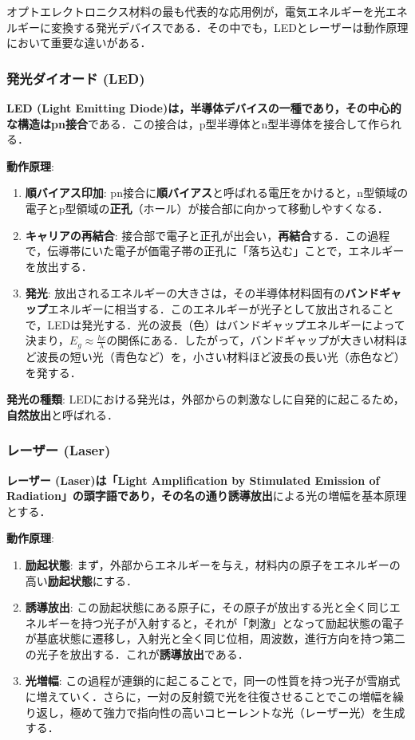 \documentclass[11pt,a4paper]{ltjsarticle}
\newcommand{\supcite}[1]{\textsuperscript{\cite{#1}}}
\begin{document}
オプトエレクトロニクス材料の最も代表的な応用例が，電気エネルギーを光エネルギーに変換する発光デバイスである．その中でも，LEDとレーザーは動作原理において重要な違いがある．

\subsubsection{発光ダイオード (LED)}

\textbf{LED (Light Emitting Diode)は，半導体デバイスの一種であり，その中心的な構造はpn接合}である．この接合は，p型半導体とn型半導体を接合して作られる\supcite{ref1}．

\textbf{動作原理}:
\begin{enumerate}
\item \textbf{順バイアス印加}: pn接合に\textbf{順バイアス}と呼ばれる電圧をかけると，n型領域の電子とp型領域の\textbf{正孔}（ホール）が接合部に向かって移動しやすくなる．
\item \textbf{キャリアの再結合}: 接合部で電子と正孔が出会い，\textbf{再結合}する．この過程で，伝導帯にいた電子が価電子帯の正孔に「落ち込む」ことで，エネルギーを放出する．
\item \textbf{発光}: 放出されるエネルギーの大きさは，その半導体材料固有の\textbf{バンドギャップ}エネルギーに相当する．このエネルギーが光子として放出されることで，LEDは発光する．光の波長（色）はバンドギャップエネルギーによって決まり，$E_g \approx \frac{hc}{\lambda}$の関係にある．したがって，バンドギャップが大きい材料ほど波長の短い光（青色など）を，小さい材料ほど波長の長い光（赤色など）を発する\supcite{ref1}．
\end{enumerate}

\textbf{発光の種類}: LEDにおける発光は，外部からの刺激なしに自発的に起こるため，\textbf{自然放出}と呼ばれる\supcite{ref1}．

\subsubsection{レーザー (Laser)}

\textbf{レーザー (Laser)は「Light Amplification by Stimulated Emission of Radiation」の頭字語であり，その名の通り誘導放出}による光の増幅を基本原理とする\supcite{ref1}．

\textbf{動作原理}:
\begin{enumerate}
\item \textbf{励起状態}: まず，外部からエネルギーを与え，材料内の原子をエネルギーの高い\textbf{励起状態}にする．
\item \textbf{誘導放出}: この励起状態にある原子に，その原子が放出する光と全く同じエネルギーを持つ光子が入射すると，それが「刺激」となって励起状態の電子が基底状態に遷移し，入射光と全く同じ位相，周波数，進行方向を持つ第二の光子を放出する．これが\textbf{誘導放出}である．
\item \textbf{光増幅}: この過程が連鎖的に起こることで，同一の性質を持つ光子が雪崩式に増えていく．さらに，一対の反射鏡で光を往復させることでこの増幅を繰り返し，極めて強力で指向性の高いコヒーレントな光（レーザー光）を生成する\supcite{ref1}．
\end{enumerate}
\end{document}
